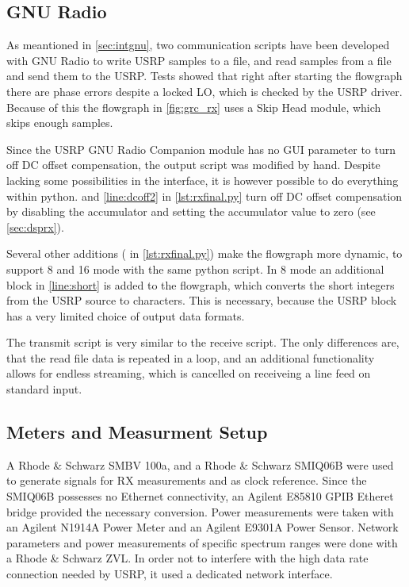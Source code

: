 \documentclass[12pt,a4paper,parskip=full]{scrartcl}
\begin{document}
\subsection{GNU Radio}
\label{sec:measgnu}
As meantioned in \cref{sec:intgnu}, two communication scripts have been developed with GNU
Radio to write USRP samples to a file, and read samples from a file and send them to the USRP.
Tests showed that right after starting the flowgraph there are phase errors despite a
locked LO, which is checked by the USRP driver. Because of this the flowgraph in \cref{fig:grc_rx}
uses a {\ttfamily Skip Head} module, which skips enough samples.

Since the USRP GNU Radio Companion module has no GUI parameter to turn off DC offset
compensation, the output script was modified by hand. Despite lacking some possibilities
in the interface, it is however possible to do everything within python.
 and \cref{line:dcoff2} in \cref{lst:rxfinal.py} turn off DC offset
compensation by disabling the accumulator and setting the accumulator value to zero 
(see \cref{sec:dsprx}).

Several other additions ( in \cref{lst:rxfinal.py})
make the flowgraph more dynamic, to support \SI{8}{\bit} and \SI{16}{\bit} mode with
the same python script. In \SI{8}{\bit} mode an additional block in \cref{line:short}
is added to the flowgraph, which converts the short integers from the USRP source to
characters. This is necessary, because the USRP block has a very limited choice of
output data formats.

The transmit script is very similar to the receive script. The only differences are,
that the read file data is repeated in a loop, and an additional functionality
allows for endless streaming, which is cancelled on receiveing a line feed on
standard input.
\subsection{Meters and Measurment Setup}
A Rhode \& Schwarz SMBV 100a, and a Rhode \& Schwarz SMIQ06B were used to generate
signals for RX measurements and as clock reference. Since the SMIQ06B possesses no
Ethernet connectivity, an Agilent E85810 GPIB Etheret bridge provided the necessary
conversion. Power measurements were taken with an Agilent N1914A Power Meter and an
Agilent E9301A Power Sensor. Network parameters and power measurements of specific
spectrum ranges were done with a Rhode \& Schwarz ZVL. In order not to interfere
with the high data rate connection needed by USRP, it used a dedicated network interface.
\end{document}
